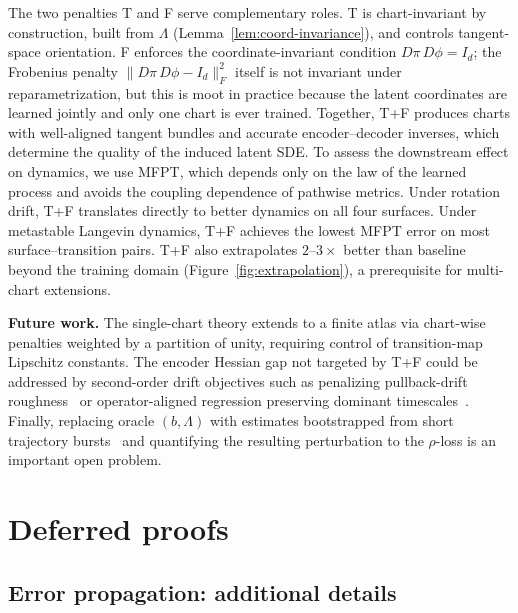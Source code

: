 \documentclass[11pt]{article}
\newcommand{\norm}[1]{\lVert#1\rVert}
\begin{document}
The two penalties T and F serve complementary roles.
T is chart-invariant by construction, built from $\Lambda$
(Lemma~\ref{lem:coord-invariance}), and controls tangent-space
orientation.
F enforces the coordinate-invariant condition
$D\pi\,D\phi = I_d$; the Frobenius penalty
$\norm{D\pi\,D\phi-I_d}_F^2$ itself is not invariant
under reparametrization, but this is moot in practice
because the latent coordinates are learned jointly and
only one chart is ever trained.
Together, T+F produces charts with well-aligned tangent bundles and
accurate encoder--decoder inverses, which determine the quality of
the induced latent SDE.
To assess the downstream effect on dynamics, we use MFPT,
which depends only on the law of the learned process and
avoids the coupling dependence of pathwise metrics.
Under rotation drift, T+F translates directly to better
dynamics on all four surfaces.
Under metastable Langevin dynamics, T+F achieves the
lowest MFPT error on most surface--transition pairs.
T+F also extrapolates $2$--$3{\times}$ better than
baseline beyond the training domain
(Figure~\ref{fig:extrapolation}), a prerequisite for
multi-chart extensions.

\noindent \textbf{Future work.}
The single-chart theory extends to a finite atlas via
chart-wise penalties weighted by a partition of unity,
requiring control of transition-map Lipschitz constants.
The encoder Hessian gap not targeted by T+F could be
addressed by second-order drift objectives such as
penalizing pullback-drift
roughness~\cite{Bittracher2018} or operator-aligned
regression preserving dominant
timescales~\cite{Klus2018}.
Finally, replacing oracle $(b,\Lambda)$ with estimates
bootstrapped from short trajectory
bursts~\cite{Miles17,yym} and quantifying the resulting
perturbation to the $\rho$-loss is an important open
problem.

\appendix

\section{Deferred proofs}\label{app:deferred}

\subsection{Error propagation: additional details}\label{app:deferred-convergence}
\end{document}
